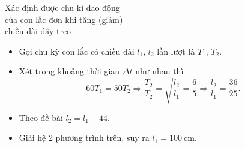 \begin{dang}{Xác định được chu kì dao động\\ của con lắc đơn khi tăng (giảm)\\ chiều dài dây treo}
{		\begin{itemize}
			\item Gọi chu kỳ con lắc có chiều dài $l_1$, $l_2$ lần lượt là $T_1$, $T_2$.
			
			\item Xét trong khoảng thời gian $\Delta t$ như nhau thì 
			\begin{equation*} 
				60T_1 =50T_2 \Rightarrow \dfrac{T_2}{T_2} =\sqrt {\dfrac{l_2}{l_1}} =\dfrac{6}{5} \Rightarrow \dfrac{l_2}{l_1} =\dfrac{36}{25}.
			\end{equation*}
			\item Theo đề bài $l_2=l_1+44$.
			\item Giải hệ 2 phương trình trên, suy ra $l_1=100\ \text{cm}$.
			
		\end{itemize}
	}
\end{dang}
